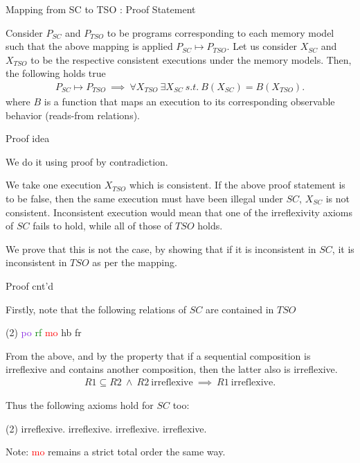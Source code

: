 \documentclass[xcolor={dvipsnames}, notes]{beamer}
\newcommand{\po}{\textcolor{BlueViolet}{po}}
\newcommand{\rf}{\textcolor{Green}{rf}}
\newcommand{\mo}{\textcolor{Red}{mo}}
\newcommand{\hb}{\textcolor{NavyBlue}{hb}}
\newcommand{\fr}{\textcolor{RubineRed}{fr}}
\begin{document}
    \begin{frame}{Mapping from SC to TSO : Proof Statement}

        Consider $P_{SC}$ and $P_{TSO}$ to be programs corresponding to each memory model such that the above mapping is applied $P_{SC} \mapsto P_{TSO}$.
        Let us consider $X_{SC}$ and $X_{TSO}$ to be the respective consistent executions under the memory models.
        Then, the following holds true
        \begin{align*}
            P_{SC} \mapsto P_{TSO} \ \implies \ \forall X_{TSO} \ \exists X_{SC} \ \textit{s.t.} \ B(X_{SC}) = B(X_{TSO}). 
        \end{align*}
        where $B$ is a function that maps an execution to its corresponding observable behavior (reads-from relations).
        
    \end{frame}

    \begin{frame}{Proof idea}
        
        We do it using proof by contradiction.

        We take one execution $X_{TSO}$ which is consistent.
        If the above proof statement is to be false, then the same execution must have been illegal under $SC$, $X_{SC}$ is not consistent.
        Inconsistent execution would mean that one of the irreflexivity axioms of $SC$ fails to hold, while all of those of $TSO$ holds.

        We prove that this is not the case, by showing that if it is inconsistent in $SC$, it is inconsistent in $TSO$ as per the mapping.
        
    \end{frame}

    \begin{frame}{Proof cnt'd}

        Firstly, note that the following relations of $SC$ are contained in $TSO$
        \begin{tasks}(2)
            \task \po
            \task \rf
            \task \mo
            \task \hb
            \task \fr
        \end{tasks}

        From the above, and by the property that if a sequential composition is irreflexive and contains another composition, then the latter also is irreflexive.
        \begin{align*}
            R1 \subseteq R2 \ \wedge \ R2 \ \text{irreflexive} \ \implies \ R1 \ \text{irreflexive}.
        \end{align*}
        
        Thus the following axioms hold for $SC$ too:
        \begin{tasks}(2)
            \task {\hb} irreflexive.
            \task {\mo;\hb} irreflexive.
            \task {\fr;\hb} irreflexive.
            \task {\fr;\mo} irreflexive.
        \end{tasks}

        Note: {\mo} remains a strict total order the same way.

    \end{frame}
\end{document}
